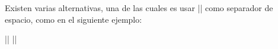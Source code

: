  


\bigskip


\bigskip

\respuestaS Existen varias alternativas, una de las cuales es usar
|{}| como separador de espacio, como en el siguiente ejemplo:

\literalblanco |{}| \literalblanco |{}| \literalblanco

\bye
